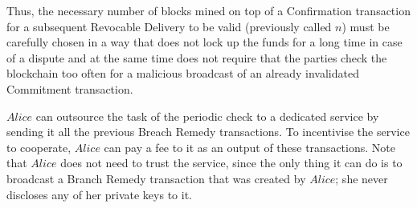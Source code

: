   Thus, the necessary number of blocks mined on top of a Confirmation transaction for a
  subsequent Revocable Delivery to be valid (previously called $n$) must be carefully
  chosen in a way that does not lock up the funds for a long time in case of a dispute
  and at the same time does not require that the parties check the blockchain too often
  for a malicious broadcast of an already invalidated Commitment transaction.

  $Alice$ can outsource the task of the periodic check to a dedicated service by sending
  it all the previous Breach Remedy transactions. To incentivise the service to cooperate,
  $Alice$ can pay a fee to it as an output of these transactions. Note that $Alice$ does
  not need to trust the service, since the only thing it can do is to broadcast a Branch
  Remedy transaction that was created by $Alice$; she never discloses any of her private
  keys to it.
